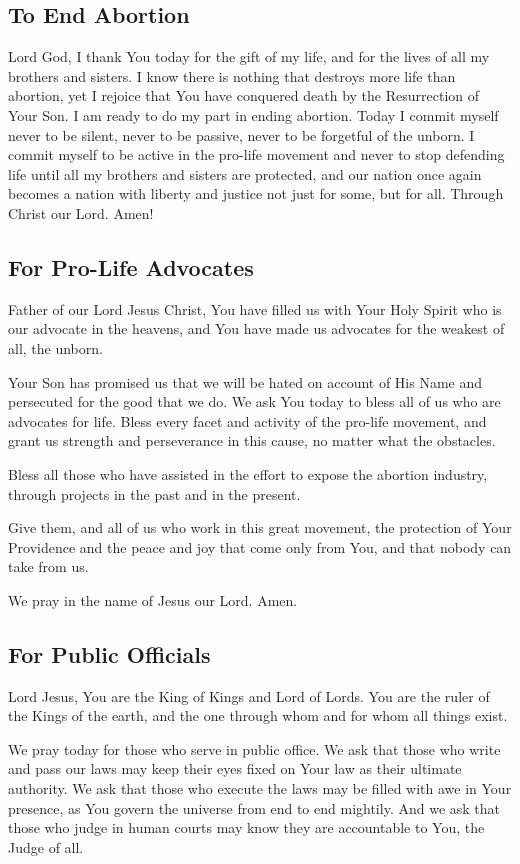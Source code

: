 \documentclass[12pt]{article}
\newcommand{\prayertitle}[1]{\subsection{#1}}
\begin{document}
\prayertitle{To End Abortion}
Lord God, I thank You today for the gift of my life, and for the lives of all my brothers and sisters.
I know there is nothing that destroys more life than abortion, yet I rejoice that You have conquered death by the Resurrection of Your Son. 
I am ready to do my part in ending abortion. Today I commit myself 
never to be silent, 
never to be passive, 
never to be forgetful of the unborn. 
I commit myself to be active in the pro-life movement and never to stop defending life until all my brothers and sisters are protected, and our nation once again becomes a nation with liberty and justice not just for some, but for all.
Through Christ our Lord. Amen!

\prayertitle{For Pro-Life Advocates}
Father of our Lord Jesus Christ,
You have filled us with Your Holy Spirit who is our advocate in the heavens, and You have made us advocates for the weakest of all, the unborn.

Your Son has promised us that we will be hated on account of His Name and persecuted for the good that we do.
We ask You today to bless all of us who are advocates for life.
Bless every facet and activity of the pro-life movement, and grant us strength and perseverance in this cause, no matter what the obstacles.

Bless all those who have assisted in the effort to expose the abortion industry, through projects in the past and in the present.

Give them, and all of us who work in this great movement, the protection of Your Providence and the peace and joy that come only from You, and that nobody can take from us.

We pray in the name of Jesus our Lord. Amen.

\prayertitle{For Public Officials}
Lord Jesus,
You are the King of Kings and Lord of Lords.
You are the ruler of the Kings of the earth, and the one through whom and for whom all things exist.

We pray today for those who serve in public office.
We ask that those who write and pass our laws may keep their eyes fixed on Your law as their ultimate authority.
We ask that those who execute the laws may be filled with awe in Your presence, as You govern the universe from end to end mightily.
And we ask that those who judge in human courts may know they are accountable to You, the Judge of all.
\end{document}
